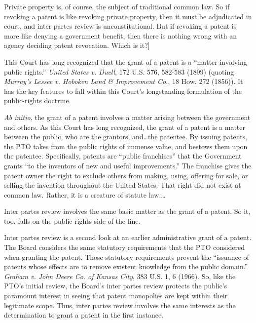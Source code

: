 Private property is, of course, the subject of traditional common law. So if
revoking a patent is like revoking private property, then it must be adjudicated
in court, and inter partes review is unconstitutional. But if revoking a patent
is more like denying a government benefit, then there is nothing wrong with an
agency deciding patent revocation. Which is it?]



This Court has long recognized that the grant of a patent is a ``matter
involving public rights.'' \textit{United States v. Duell}, 172 U.S. 576,
582-583 (1899) (quoting \textit{Murray's Lessee v. Hoboken Land \& Improvement
Co.}, 18 How. 272 (1856)). It has the key features to fall within this Court's
longstanding formulation of the public-rights doctrine.

\textit{Ab initio}, the grant of a patent involves a matter arising between the
government and others. As this Court has long recognized, the grant of a patent
is a matter between the public, who are the grantors, and\ldots the patentee. By
issuing patents, the PTO takes from the public rights of immense value, and
bestows them upon the patentee. Specifically, patents are ``public franchises''
that the Government grants ``to the inventors of new and useful improvements.''
The franchise gives the patent owner the right to exclude
others from making, using, offering for sale, or selling the invention
throughout the United States. That right did not exist at common law. Rather, it
is a creature of statute law.\ldots




Inter partes review involves the same basic matter as the grant of a patent. So
it, too, falls on the public-rights side of the line.

Inter partes review is a second look at an earlier administrative grant of a
patent. The Board considers the same statutory requirements that the PTO
considered when granting the patent. Those statutory requirements prevent the
``issuance of patents whose effects are to remove existent knowledge from the
public domain.'' \textit{Graham v. John Deere Co. of Kansas City}, 383 U.S. 1, 6
(1966). So, like the PTO's initial review, the Board's inter partes review
protects the public's paramount interest in seeing that patent monopolies are
kept within their legitimate scope. Thus, inter partes review involves the same
interests as the determination to grant a patent in the first instance.

